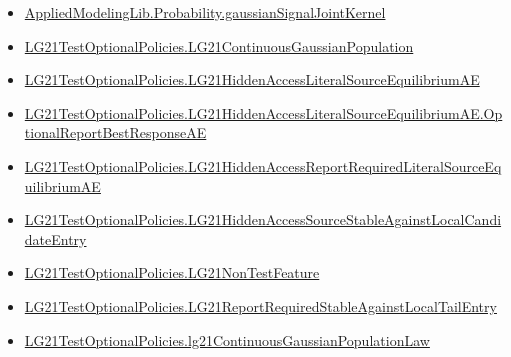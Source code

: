 \documentclass[10pt]{article}
\begin{document}
\begin{itemize}\raggedright
\item \hyperlink{governing-declaration-32a3aa66a55c966a}{Applied\allowbreak{}Modeling\allowbreak{}Lib.\allowbreak{}Probability.\allowbreak{}gaussian\allowbreak{}Signal\allowbreak{}Joint\allowbreak{}Kernel}
\item \hyperlink{paper-prerequisite-f5e1c886d250142b}{LG21\allowbreak{}Test\allowbreak{}Optional\allowbreak{}Policies.\allowbreak{}LG21\allowbreak{}Continuous\allowbreak{}Gaussian\allowbreak{}Population}
\item \hyperlink{governing-declaration-f111cafc341ec52d}{LG21\allowbreak{}Test\allowbreak{}Optional\allowbreak{}Policies.\allowbreak{}LG21\allowbreak{}Hidden\allowbreak{}Access\allowbreak{}Literal\allowbreak{}Source\allowbreak{}Equilibrium\allowbreak{}AE}
\item \hyperlink{governing-declaration-02ac234121b25d41}{LG21\allowbreak{}Test\allowbreak{}Optional\allowbreak{}Policies.\allowbreak{}LG21\allowbreak{}Hidden\allowbreak{}Access\allowbreak{}Literal\allowbreak{}Source\allowbreak{}Equilibrium\allowbreak{}AE.\allowbreak{}Optional\allowbreak{}Report\allowbreak{}Best\allowbreak{}Response\allowbreak{}AE}
\item \hyperlink{governing-declaration-99e6af37e85fd9c2}{LG21\allowbreak{}Test\allowbreak{}Optional\allowbreak{}Policies.\allowbreak{}LG21\allowbreak{}Hidden\allowbreak{}Access\allowbreak{}Report\allowbreak{}Required\allowbreak{}Literal\allowbreak{}Source\allowbreak{}Equilibrium\allowbreak{}AE}
\item \hyperlink{governing-declaration-b8206670d6659592}{LG21\allowbreak{}Test\allowbreak{}Optional\allowbreak{}Policies.\allowbreak{}LG21\allowbreak{}Hidden\allowbreak{}Access\allowbreak{}Source\allowbreak{}Stable\allowbreak{}Against\allowbreak{}Local\allowbreak{}Candidate\allowbreak{}Entry}
\item \hyperlink{governing-declaration-81cb73bf3869c56d}{LG21\allowbreak{}Test\allowbreak{}Optional\allowbreak{}Policies.\allowbreak{}LG21\allowbreak{}Non\allowbreak{}Test\allowbreak{}Feature}
\item \hyperlink{governing-declaration-3596d40537969e3c}{LG21\allowbreak{}Test\allowbreak{}Optional\allowbreak{}Policies.\allowbreak{}LG21\allowbreak{}Report\allowbreak{}Required\allowbreak{}Stable\allowbreak{}Against\allowbreak{}Local\allowbreak{}Tail\allowbreak{}Entry}
\item \hyperlink{governing-declaration-8fd8cc4e09eeb58a}{LG21\allowbreak{}Test\allowbreak{}Optional\allowbreak{}Policies.\allowbreak{}lg21\allowbreak{}Continuous\allowbreak{}Gaussian\allowbreak{}Population\allowbreak{}Law}

\end{itemize}
\end{document}
